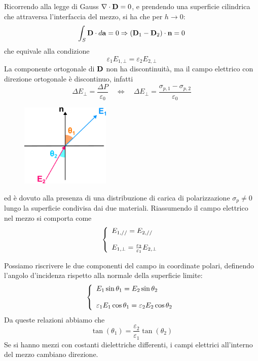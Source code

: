 Ricorrendo alla legge di Gauss $\nabla \cdot \bold{D} = 0$, e prendendo una superficie cilindrica che attraversa l'interfaccia del mezzo, si ha che per $h \to 0 $:
\begin{equation*}
	\int_{S} \bold{D} \cdot d\bold{a} = 0 \Rightarrow (\bold{D}_{1} - \bold{D}_2) \cdot \bold{n} = 0
\end{equation*}
che equivale alla condizione
\begin{equation*}
	\varepsilon_1 E_{1,\bot} = \varepsilon_2 E_{2,\bot}
\end{equation*}
La componente ortogonale di $\bold{D}$ non ha discontinuit\`a, ma il campo elettrico con direzione ortogonale \`e discontinuo, infatti
\begin{equation*}
	\Delta E_{\bot} = \frac{\Delta P}{\varepsilon_0} \quad \iff \quad \Delta E_{\bot} = \frac{\sigma_{p,1}-\sigma_{p,2}}{\varepsilon_0}
\end{equation*}

\begin{figure} %
    \centering
    \includegraphics[width=0.38\textwidth]{images/incident} %
\end{figure}
ed \`e dovuto alla presenza di una distribuzione di carica di polarizzazione $\sigma_{p} \neq 0$ lungo la superficie condivisa dai due materiali. Riassumendo il campo elettrico nel mezzo si comporta come 
\begin{equation*}
	\left \{ \begin{array}{l}
	E_{1,//} = E_{2,//} \\ \rule{0pt}{20pt}
	E_{1, \bot} = \frac{\varepsilon_2}{\varepsilon_1}E_{2, \bot}	
	\end{array}\right.
\end{equation*} 


Possiamo riscrivere le due componenti del campo in coordinate polari, definendo l'angolo d'incidenza rispetto alla normale della superficie limite:
\begin{equation*}
	\left \{ \begin{array}{l}
		E_1 \sin \theta_1 = E_2 \sin \theta_2 \\ \rule{0pt}{20pt}
		\varepsilon_1 E_1 \cos \theta_1 = \varepsilon_2 E_2 \cos\theta_2
	\end{array}\right.
\end{equation*}
 Da queste relazioni abbiamo che 
 \begin{equation*}
 	\tan(\theta_1) = \frac{\varepsilon_2}{\varepsilon_1} \tan(\theta_2)
 \end{equation*}
 Se si hanno mezzi con costanti dielettriche differenti, i campi elettrici all'interno del mezzo cambiano direzione.
 
